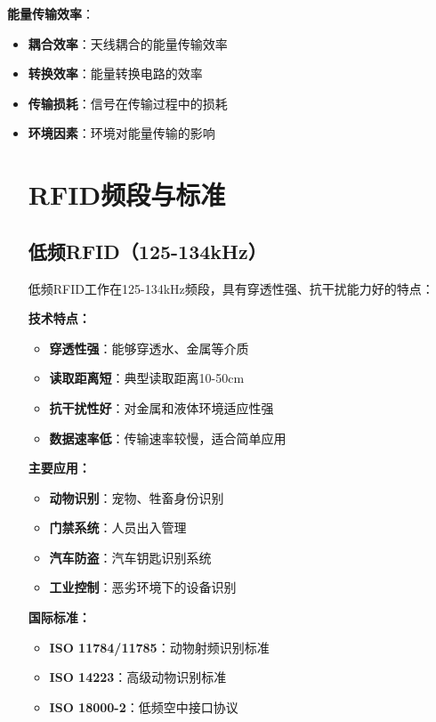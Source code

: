\documentclass[12pt,UTF8]{ctexbook}
\begin{document}
\textbf{能量传输效率}：
\begin{itemize}[leftmargin=3.5em]
    \item \textbf{耦合效率}：天线耦合的能量传输效率
    \item \textbf{转换效率}：能量转换电路的效率
    \item \textbf{传输损耗}：信号在传输过程中的损耗
    \item \textbf{环境因素}：环境对能量传输的影响

\chapter{RFID频段与标准}

\section{低频RFID（125-134kHz）}

低频RFID工作在125-134kHz频段，具有穿透性强、抗干扰能力好的特点：

\textbf{技术特点：}
\begin{itemize}[leftmargin=3.5em]
    \item \textbf{穿透性强}：能够穿透水、金属等介质
    \item \textbf{读取距离短}：典型读取距离10-50cm
    \item \textbf{抗干扰性好}：对金属和液体环境适应性强
    \item \textbf{数据速率低}：传输速率较慢，适合简单应用
\end{itemize}

\textbf{主要应用：}
\begin{itemize}[leftmargin=3.5em]
    \item \textbf{动物识别}：宠物、牲畜身份识别
    \item \textbf{门禁系统}：人员出入管理
    \item \textbf{汽车防盗}：汽车钥匙识别系统
    \item \textbf{工业控制}：恶劣环境下的设备识别
\end{itemize}

\textbf{国际标准：}
\begin{itemize}[leftmargin=3.5em]
    \item \textbf{ISO 11784/11785}：动物射频识别标准
    \item \textbf{ISO 14223}：高级动物识别标准
    \item \textbf{ISO 18000-2}：低频空中接口协议
\end{itemize}


\end{itemize}
\end{document}
